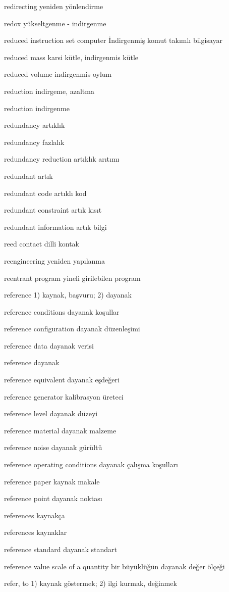 \documentclass[12pt,fleqn]{article}\usepackage{../../common}
\begin{document}
redirecting yeniden yönlendirme

redox yükseltgenme - indirgenme

reduced instruction set computer İndirgenmiş komut takımlı bilgisayar

reduced mass karsi kütle, indirgenmis kütle

reduced volume indirgenmis oylum

reduction indirgeme, azaltma

reduction indirgenme

redundancy artıklık

redundancy fazlalık

redundancy reduction artıklık arıtımı

redundant artık

redundant code artıklı kod

redundant constraint artık kısıt

redundant information artık bilgi

reed contact dilli kontak

reengineering yeniden yapılanma

reentrant program yineli girilebilen program

reference 1) kaynak, başvuru; 2) dayanak

reference conditions dayanak koşullar

reference configuration dayanak düzenleşimi

reference data dayanak verisi

reference dayanak

reference equivalent dayanak eşdeğeri

reference generator kalibrasyon üreteci

reference level dayanak düzeyi

reference material dayanak malzeme

reference noise dayanak gürültü

reference operating conditions dayanak çalışma koşulları

reference paper kaynak makale

reference point dayanak noktası

references kaynakça

references kaynaklar

reference standard dayanak standart

reference value scale of a quantity bir büyüklüğün dayanak değer ölçeği

refer, to 1) kaynak göstermek; 2) ilgi kurmak, değinmek
\end{document}
